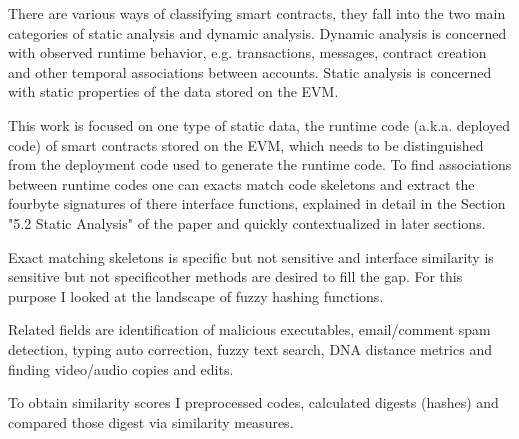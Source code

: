 \documentclass[../main.tex]{subfiles}
\begin{document}
There are various ways of classifying smart contracts, they fall into the two main categories of
static analysis and dynamic analysis.
Dynamic analysis is concerned with observed runtime behavior, e.g. transactions, messages, contract creation and other temporal associations between accounts.
Static analysis is concerned with static properties of the data stored on the EVM.

This work is focused on one type of static data, the runtime code (a.k.a. deployed code) of smart contracts stored on the EVM, which needs to be distinguished from the deployment code used to generate the runtime code.
To find associations between runtime codes one can exacts match code skeletons  and extract the fourbyte signatures  of there interface functions, explained in detail in the Section "5.2 Static Analysis" of the paper  and quickly contextualized in later sections.

Exact matching skeletons is specific but not sensitive and interface similarity is sensitive but not specific\textemdash{}other methods are desired to fill the gap. For this purpose I looked at the landscape of fuzzy hashing functions.

Related fields are identification of malicious executables, email/comment spam detection, typing auto correction, fuzzy text search, DNA distance metrics and finding video/audio copies and edits.

To obtain similarity scores I preprocessed codes, calculated digests (hashes) and compared those digest via similarity measures.
\end{document}
